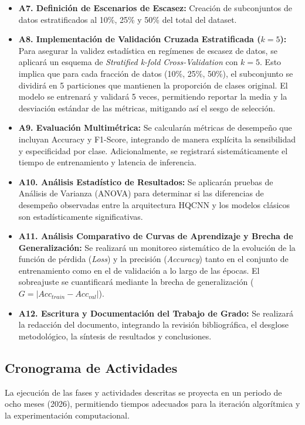 \documentclass[12pt,letterpaper]{article}
\begin{document}
    \begin{itemize}
        \item \textbf{A7. Definición de Escenarios de Escasez:} Creación de subconjuntos de datos estratificados al 10\%, 25\% y 50\% del total del dataset.

        \item \textbf{A8. Implementación de Validación Cruzada Estratificada ($k=5$):} Para asegurar la validez estadística en regímenes de escasez de datos, se aplicará un esquema de \textit{Stratified k-fold Cross-Validation} con $k=5$. Esto implica que para cada fracción de datos (10\%, 25\%, 50\%), el subconjunto se dividirá en 5 particiones que mantienen la proporción de clases original. El modelo se entrenará y validará 5 veces, permitiendo reportar la media y la desviación estándar de las métricas, mitigando así el sesgo de selección.

        \item \textbf{A9. Evaluación Multimétrica:} Se calcularán métricas de desempeño que incluyan Accuracy y F1-Score, integrando de manera explícita la sensibilidad y especificidad por clase. Adicionalmente, se registrará sistemáticamente el tiempo de entrenamiento y latencia de inferencia.
        
        \item \textbf{A10. Análisis Estadístico de Resultados:} Se aplicarán pruebas de Análisis de Varianza (ANOVA) para determinar si las diferencias de desempeño observadas entre la arquitectura HQCNN y los modelos clásicos son estadísticamente significativas.

        \item \textbf{A11. Análisis Comparativo de Curvas de Aprendizaje y Brecha de Generalización:} Se realizará un monitoreo sistemático de la evolución de la función de pérdida (\textit{Loss}) y la precisión (\textit{Accuracy}) tanto en el conjunto de entrenamiento como en el de validación a lo largo de las épocas. El sobreajuste se cuantificará mediante la brecha de generalización ($G = |Acc_{train} - Acc_{val}|$). 

        \item \textbf{A12. Escritura y Documentación del Trabajo de Grado:} Se realizará la redacción del documento, integrando la revisión bibliográfica, el desglose metodológico, la síntesis de resultados y conclusiones.
        
    \end{itemize}
    
    \subsection{Cronograma de Actividades}
    La ejecución de las fases y actividades descritas se proyecta en un periodo de ocho meses (2026), permitiendo tiempos adecuados para la iteración algorítmica y la experimentación computacional.
\end{document}

